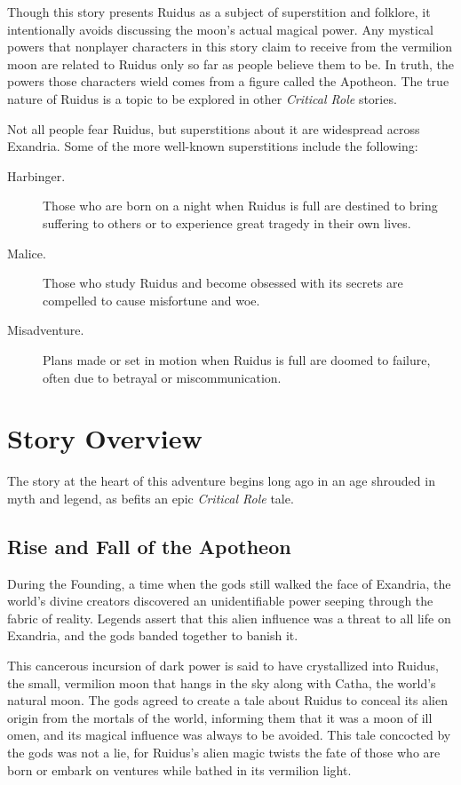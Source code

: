 \documentclass[letterpaper, 11pt, bg=full, twocolumn]{dndbook}
\begin{document}
Though this story presents Ruidus as a subject of superstition and folklore, it intentionally avoids discussing the moon's actual magical power. Any mystical powers that nonplayer characters in this story claim to receive from the vermilion moon are related to Ruidus only so far as people believe them to be. In truth, the powers those characters wield comes from a figure called the Apotheon. The true nature of Ruidus is a topic to be explored in other \textit{Critical Role} stories.

Not all people fear Ruidus, but superstitions about it are widespread across Exandria. Some of the more well-known superstitions include the following:

\begin{description}
\item[Harbinger.] Those who are born on a night when Ruidus is full are destined to bring suffering to others or to experience great tragedy in their own lives.
\item[Malice.] Those who study Ruidus and become obsessed with its secrets are compelled to cause misfortune and woe.
\item[Misadventure.] Plans made or set in motion when Ruidus is full are doomed to failure, often due to betrayal or miscommunication.
\end{description}
\section{Story Overview}

The story at the heart of this adventure begins long ago in an age shrouded in myth and legend, as befits an epic \textit{Critical Role} tale.

\subsection{Rise and Fall of the Apotheon}


During the Founding, a time when the gods still walked the face of Exandria, the world's divine creators discovered an unidentifiable power seeping through the fabric of reality. Legends assert that this alien influence was a threat to all life on Exandria, and the gods banded together to banish it.

This cancerous incursion of dark power is said to have crystallized into Ruidus, the small, vermilion moon that hangs in the sky along with Catha, the world's natural moon. The gods agreed to create a tale about Ruidus to conceal its alien origin from the mortals of the world, informing them that it was a moon of ill omen, and its magical influence was always to be avoided. This tale concocted by the gods was not a lie, for Ruidus's alien magic twists the fate of those who are born or embark on ventures while bathed in its vermilion light.
\end{document}
